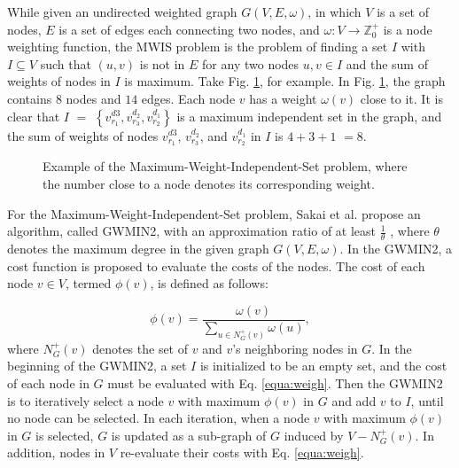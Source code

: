 While given an undirected weighted graph $G(V,E,\omega)$, in which
$V$ is a set of nodes, $E$ is a set of edges each connecting two
nodes, and $\omega : V \rightarrow \mathbb{Z}^+_0$ is a node
weighting function, the MWIS problem is the problem of finding a set
$I$ with $I \subseteq V$ such that $(u,v)$ is not in $E$ for any two
nodes $u,v \in I$ and the sum of weights of nodes in $I$ is maximum.
Take Fig. \ref{Fig:convert}, for example. In Fig. \ref{Fig:convert},
the graph contains $8$ nodes and $14$ edges. Each node $v$ has a
weight $\omega(v)$ close to it. It is clear that $I$ $=$ $\left\{
v_{{{r}_{1}}}^{d3},
v_{{{r}_{3}}}^{{{d}_{2}}},v_{{{r}_{2}}}^{{{d}_{1}}} \right\}$ is a
maximum independent set in the graph, and the sum of weights of
nodes $v_{{{r}_{1}}}^{d3}$, $v_{{{r}_{3}}}^{{{d}_{2}}}$, and
$v_{{{r}_{2}}}^{{{d}_{1}}}$ in $I$ is $4+3+1$ $=8$.


\begin{figure}
\center {}
\caption{Example of the Maximum-Weight-Independent-Set problem,
where the number close to a node denotes its corresponding weight.}
\label{Fig:convert}
\end{figure}



For the Maximum-Weight-Independent-Set problem, Sakai et al. propose
an algorithm, called GWMIN2, with an approximation ratio of at least
$\frac{1}{\theta}$ \cite{Sakai2003313}, where $\theta$ denotes the
maximum degree in the given graph $G(V,E,\omega)$. In the GWMIN2, a
cost function is proposed to evaluate the costs of the nodes. The
cost of each node $v \in V$, termed $\phi(v)$, is defined as
follows:

\begin{equation}\label{equa:weigh}
\phi(v) = \frac{\omega (v)}{\sum\nolimits_{u\in N_{G}^{+}(v)}{\omega
(u)}},
\end{equation}
where $N_{G}^{+}\left( v \right)$ denotes the set of $v$ and $v$'s
neighboring nodes in $G$. In the beginning of the GWMIN2, a set $I$
is initialized to be an empty set, and the cost of each node in $G$
must be evaluated with Eq. \ref{equa:weigh}. Then the GWMIN2 is to
iteratively select a node $v$ with maximum $\phi(v)$ in $G$ and add
$v$ to $I$, until no node can be selected. In each iteration, when a
node $v$ with maximum $\phi(v)$ in $G$ is selected, $G$ is updated
as a sub-graph of $G$ induced by $V - N_{G}^{+}\left( v \right)$. In
addition, nodes in $V$ re-evaluate their costs with Eq.
\ref{equa:weigh}.


